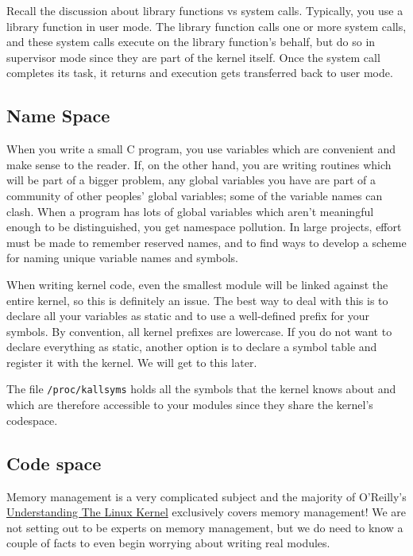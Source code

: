 \documentclass[10pt, oneside]{book}
\begin{document}
Recall the discussion about library functions vs system calls.
Typically, you use a library function in user mode.
The library function calls one or more system calls, and these system calls execute on the library function's behalf, but do so in supervisor mode since they are part of the kernel itself.
Once the system call completes its task, it returns and execution gets transferred back to user mode.

\subsection{Name Space}
\label{sec:namespace}
When you write a small C program, you use variables which are convenient and make sense to the reader.
If, on the other hand, you are writing routines which will be part of a bigger problem, any global variables you have are part of a community of other peoples' global variables; some of the variable names can clash.
When a program has lots of global variables which aren't meaningful enough to be distinguished, you get namespace pollution.
In large projects, effort must be made to remember reserved names, and to find ways to develop a scheme for naming unique variable names and symbols.

When writing kernel code, even the smallest module will be linked against the entire kernel, so this is definitely an issue.
The best way to deal with this is to declare all your variables as static and to use a well-defined prefix for your symbols.
By convention, all kernel prefixes are lowercase. If you do not want to declare everything as static, another option is to declare a symbol table and register it with the kernel.
We will get to this later.

The file \verb|/proc/kallsyms| holds all the symbols that the kernel knows about and which are therefore accessible to your modules since they share the kernel's codespace.

\subsection{Code space}
\label{sec:codespace}
Memory management is a very complicated subject and the majority of O'Reilly's \href{https://www.oreilly.com/library/view/understanding-the-linux/0596005652/}{Understanding The Linux Kernel} exclusively covers memory management!
We are not setting out to be experts on memory management, but we do need to know a couple of facts to even begin worrying about writing real modules.
\end{document}
